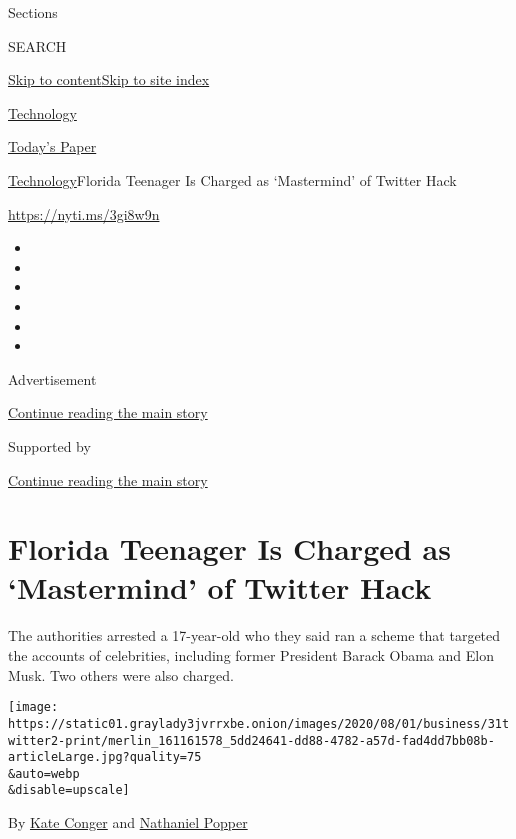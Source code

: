 Sections

SEARCH

\protect\hyperlink{site-content}{Skip to
content}\protect\hyperlink{site-index}{Skip to site index}

\href{https://www.nytimes3xbfgragh.onion/section/technology}{Technology}

\href{https://myaccount.nytimes3xbfgragh.onion/auth/login?response_type=cookie\&client_id=vi}{}

\href{https://www.nytimes3xbfgragh.onion/section/todayspaper}{Today's
Paper}

\href{/section/technology}{Technology}\textbar{}Florida Teenager Is
Charged as `Mastermind' of Twitter Hack

\url{https://nyti.ms/3gi8w9n}

\begin{itemize}
\item
\item
\item
\item
\item
\item
\end{itemize}

Advertisement

\protect\hyperlink{after-top}{Continue reading the main story}

Supported by

\protect\hyperlink{after-sponsor}{Continue reading the main story}

\hypertarget{florida-teenager-is-charged-as-mastermind-of-twitter-hack}{%
\section{Florida Teenager Is Charged as `Mastermind' of Twitter
Hack}\label{florida-teenager-is-charged-as-mastermind-of-twitter-hack}}

The authorities arrested a 17-year-old who they said ran a scheme that
targeted the accounts of celebrities, including former President Barack
Obama and Elon Musk. Two others were also charged.

\texttt{[image: https://static01.graylady3jvrrxbe.onion/images/2020/08/01/business/31twitter2-print/merlin\_161161578\_5dd24641-dd88-4782-a57d-fad4dd7bb08b-articleLarge.jpg?quality=75\\\&auto=webp\\\&disable=upscale]}

By \href{https://www.nytimes3xbfgragh.onion/by/kate-conger}{Kate Conger}
and
\href{https://www.nytimes3xbfgragh.onion/by/nathaniel-popper}{Nathaniel
Popper}

